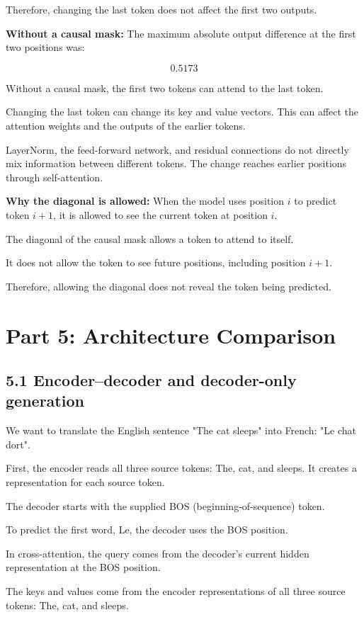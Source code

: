 \documentclass[11pt]{article}
\begin{document}
Therefore, changing the last token does
not affect the first two outputs.

\textbf{Without a causal mask:} The maximum absolute output difference
at the first two positions was:

\[
\boxed{0.5173}
\]

Without a causal mask, the first two tokens
can attend to the last token.

Changing the last token can change its
key and value vectors. This can affect
the attention weights and the outputs
of the earlier tokens.

LayerNorm, the feed-forward network,
and residual connections do not directly
mix information between different tokens.
The change reaches earlier positions
through self-attention.

\textbf{Why the diagonal is allowed:} When the model uses position $i$ to predict
token $i+1$, it is allowed to see the
current token at position $i$.

The diagonal of the causal mask allows
a token to attend to itself.

It does not allow the token to see
future positions, including position $i+1$.

Therefore, allowing the diagonal does
not reveal the token being predicted.
\section*{Part 5: Architecture Comparison}
\subsection*{5.1 Encoder--decoder and decoder-only generation}
We want to translate the English sentence "The cat sleeps" into French: "Le chat dort".

First, the encoder reads all three source tokens:
The, cat, and sleeps. It creates a representation
for each source token.

The decoder starts with the supplied BOS
(beginning-of-sequence) token.

To predict the first word, Le, the decoder
uses the BOS position.

In cross-attention, the query comes from the
decoder's current hidden representation at
the BOS position.

The keys and values come from the encoder
representations of all three source tokens:
The, cat, and sleeps.
\end{document}
